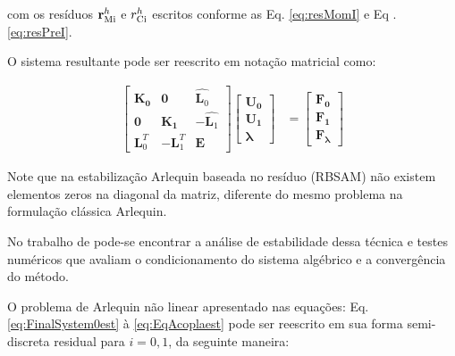 \documentclass[tese_patricia]{subfiles}
\begin{document}
\noindent com os resíduos $\mathbf{r}_{\mathrm{Mi}}^{h}$ e $r_{\mathrm{Ci}}^{h}$ escritos conforme as Eq. \ref{eq:resMomI} e Eq .\ref{eq:resPreI}.

O sistema resultante pode ser reescrito em notação matricial como:


\begin{align}
	\begin{bmatrix}
		\mathbf{K_{0}} & \mathbf{0} & \hat{\mathbf{L}_{0}} \\
		\mathbf{0} & \mathbf{K_{1}} & - \hat{\mathbf{L}_{1}} \\
		\mathbf{L}_{0}^{T} & -\mathbf{L}_{1}^{T} & \mathbf{E}
	\end{bmatrix}
	\begin{bmatrix}
		\mathbf{U_{0}} \\
		\mathbf{U_{1}} \\
		\mathbf{\lambda}
	\end{bmatrix}
	&=
	\begin{bmatrix}
		\mathbf{F_{0}} \\
		\mathbf{F_{1}} \\
		\mathbf{F_{\lambda}}
	\end{bmatrix}
	\label{eq:sistema_linear}
\end{align}	

Note que na estabilização Arlequin baseada no resíduo (RBSAM) não existem elementos zeros na diagonal da matriz, diferente do mesmo problema na formulação clássica Arlequin.

No trabalho de  pode-se encontrar a análise de estabilidade dessa técnica e testes numéricos que avaliam o condicionamento do sistema algébrico e a convergência do método.

O problema de Arlequin não linear apresentado nas equações: Eq. \ref{eq:FinalSystem0est} à \ref{eq:EqAcoplaest} pode ser reescrito em sua forma semi-discreta residual para $i=0,1$, da seguinte maneira:
\end{document}
